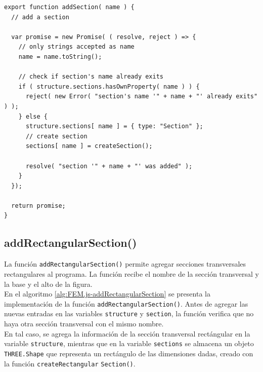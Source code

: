 \begin{lstlisting}[language={},caption=Función \texttt{addSection()} implementada en el archivo \texttt{FEM.js}.,label=alg:FEM.js-addSection, frame=single]
export function addSection( name ) {
  // add a section

  var promise = new Promise( ( resolve, reject ) => {
    // only strings accepted as name
    name = name.toString();

    // check if section's name already exits
    if ( structure.sections.hasOwnProperty( name ) ) {
      reject( new Error( "section's name '" + name + "' already exits" ) );
    } else {
      structure.sections[ name ] = { type: "Section" };
      // create section
      sections[ name ] = createSection();
  
      resolve( "section '" + name + "' was added" );
    }
  });

  return promise;
}
\end{lstlisting}
\bigskip

\subsection{addRectangularSection()}

La función \verb|addRectangularSection()| permite agregar secciones transversales rectangulares al programa. La función recibe el nombre de la sección transversal y la base y el alto de la figura.\\

En el algoritmo \ref{alg:FEM.js-addRectangularSection} se presenta la implementación de la función \verb|addRectangularSection()|. Antes de agregar las nuevas entradas en las variables \verb|structure| y \verb|section|, la función verifica que no haya otra sección transversal con el mismo nombre.\\

En tal caso, se agrega la información de la sección transversal rectángular en la variable \verb|structure|, mientras que en la variable \verb|sections| se almacena un objeto \verb|THREE.Shape| que representa un rectángulo de las dimensiones dadas, creado con la función \verb|createRectangular| \verb|Section()|.\\

